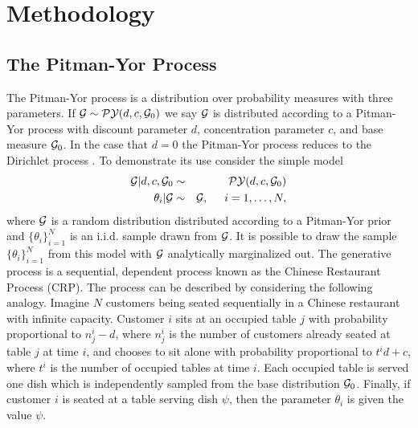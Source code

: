 \section{Methodology}
\label{section_methodology}

\subsection{The Pitman-Yor Process\cite{someone}}
The Pitman-Yor process is a distribution over probability measures with three parameters.   If $\G \sim \PY(d,c,\G_0)$ we say $\G$ is distributed according to a Pitman-Yor process with discount parameter $d$, concentration parameter $c$, and base measure $\G_0$. In the case that $d = 0$ the Pitman-Yor process reduces to the Dirichlet process \cite{Pitman1997}.  To demonstrate its use consider the simple model
%
\begin{eqnarray*}
\G | d,c,\G_0 &\sim& \PY(d,c,\G_0)\\
\theta_i | \G &\sim& \G,  \hspace{.5cm} i = 1, \dots, N,
\end{eqnarray*}
%
where $\G$ is a random distribution distributed according to a Pitman-Yor prior and $\{ \theta_i \}_{i = 1}^N$ is an i.i.d. sample drawn from $\G$.  It is possible to draw the sample $\{ \theta_i \}_{i = 1}^N$ from this model with $\G$ analytically marginalized out.  The generative process is a sequential, dependent process known as the Chinese Restaurant Process (CRP).  The process can be described by considering the following analogy.  Imagine $N$ customers being seated sequentially in a Chinese restaurant with infinite capacity.  Customer $i$ sits at an occupied table $j$ with probability proportional to $n^i_j - d$, where $n^i_j$ is the number of customers already seated at table $j$ at time $i$, and chooses to sit alone with probability proportional to $t^i d + c$, where $t^i$ is the number of occupied tables at time $i$.  Each occupied table is served one dish which is independently sampled from the base distribution $\G_0$.  Finally, if customer $i$ is seated at a table serving dish $\psi$, then the parameter $\theta_i$ is given the value $\psi$.  

